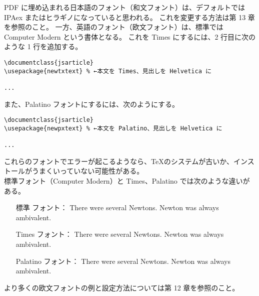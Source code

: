 PDF に埋め込まれる日本語のフォント（和文フォント）は、デフォルトでは IPAex またはヒラギノになっていると思われる。
これを変更する方法は第 13 章を参照のこと。
一方、英語のフォント（欧文フォント）は、標準では Computer Modern という書体となる。
これを Times にするには、2 行目に次のような 1 行を追加する。\\
\begin{mdframed}[roundcorner=0.50zw,leftmargin=3.00zw,rightmargin=3.00zw,skipabove=0.40zw,skipbelow=0.40zw,innertopmargin=4.00pt,innerbottommargin=4.00pt,innerleftmargin=5.00pt,innerrightmargin=5.00pt,linecolor=gray!020,linewidth=0.50pt,backgroundcolor=gray!20]
\begin{verbatim}
\documentclass{jsarticle}
\usepackage{newtxtext} % ←本文を Times、見出しを Helvetica に

...

\end{verbatim}
\end{mdframed}
また、Palatino フォントにするには、次のようにする。
\begin{mdframed}[roundcorner=0.50zw,leftmargin=3.00zw,rightmargin=3.00zw,skipabove=0.40zw,skipbelow=0.40zw,innertopmargin=4.00pt,innerbottommargin=4.00pt,innerleftmargin=5.00pt,innerrightmargin=5.00pt,linecolor=gray!020,linewidth=0.50pt,backgroundcolor=gray!20]
\begin{verbatim}
\documentclass{jsarticle}
\usepackage{newpxtext} % ←本文を Palatino、見出しを Helvetica に

...

\end{verbatim}
\end{mdframed}
これらのフォントでエラーが起こるようなら、\TeX{}のシステムが古いか、インストールがうまくいっていない可能性がある。\\

標準フォント（Computer Modern）と Times、Palatino では次のような違いがある。
\begin{itemize}\setlength{\leftskip}{7.30zw}%
\item[標準     フォント：] { \selectfont There were several Newtons. Newton was always ambivalent.}
\item[Times    フォント：] { \selectfont There were several Newtons. Newton was always ambivalent.}
\item[Palatino フォント：] {\selectfont There were several Newtons. Newton was always ambivalent.}
\end{itemize}
より多くの欧文フォントの例と設定方法については第 12 章を参照のこと。
